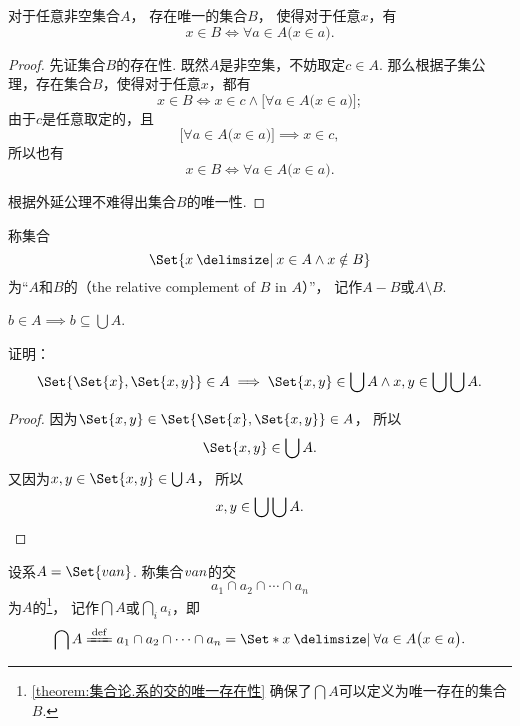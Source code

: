 \begin{theorem}\label{theorem:集合论.系的交的唯一存在性}
对于任意非空集合\(A\)，%
存在唯一的集合\(B\)，%
使得对于任意\(x\)，有\[
	x \in B
	\iff
	\forall a \in A \bigl( x \in a \bigr).
\]
\begin{proof}
先证集合\(B\)的存在性.
既然\(A\)是非空集，不妨取定\(c \in A\).
那么根据子集公理，存在集合\(B\)，使得对于任意\(x\)，都有\[
	x \in B
	\iff x \in c \land \bigl[ \forall a \in A \bigl( x \in a \bigr) \bigr];
\]
由于\(c\)是任意取定的，且\[
	\bigl[ \forall a \in A \bigl( x \in a \bigr) \bigr]
	\implies
	x \in c,
\]
所以也有\[
	x \in B
	\iff \forall a \in A \bigl( x \in a \bigr).
\]

根据外延公理不难得出集合\(B\)的唯一性.
\end{proof}
\end{theorem}

\begin{definition}
称集合\[
\Set{ x \given x \in A \land x \notin B }
\]为“\(A\)和\(B\)的（the relative complement of \(B\) in \(A\)）”，%
记作\(A - B\)或\(A \setminus B\).
\end{definition}

\begin{property}
\(b \in A \implies b \subseteq \bigcup A\).
\end{property}

\begin{example}
证明：
\begin{equation}\label{equation:集合论.有序对各元素的取值范围}
	\Set{ \Set{x}, \Set{x,y} } \in A
	\implies
	\Set{x,y} \in \bigcup A
	\land
	x,y \in \bigcup\bigcup A.
\end{equation}
\begin{proof}
因为\(\Set{x,y} \in \Set{ \Set{x}, \Set{x,y} } \in A\)，
所以\[
	\Set{x,y} \in \bigcup A.
\]
又因为\(x,y \in \Set{x,y} \in \bigcup A\)，
所以\[
	x,y \in \bigcup\bigcup A.
	\qedhere
\]
\end{proof}
\end{example}

\begin{definition}
设系\(A = \Set{\v{a}{n}}\).
称集合\(v{a}{n}\)的交\[
	a_1 \cap a_2 \cap \dotsb \cap a_n
\]为\(A\)的\footnote{%
\cref{theorem:集合论.系的交的唯一存在性} 确保了\(\bigcap A\)可以定义为唯一存在的集合\(B\).
}，%
记作\(\bigcap A\)或\(\bigcap\limits_i a_i\)，即\[
	\bigcap A
	\defeq
	a_1 \cap a_2 \cap \dotsb \cap a_n
	= \Set*{ x \given \forall a \in A \bigl(x \in a\bigr) }.
\]
\end{definition}

